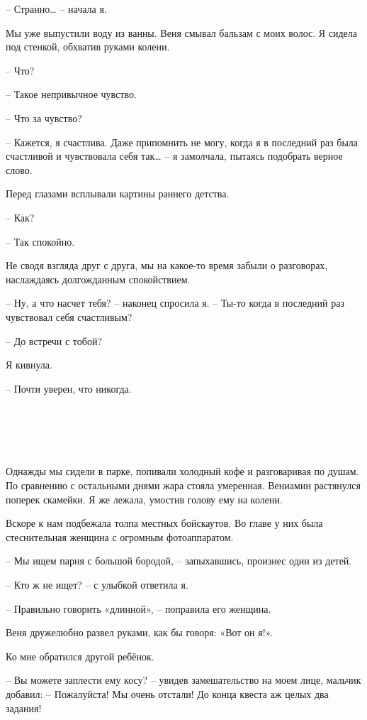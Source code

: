 \documentclass[
]{book}
\begin{document}
-- Странно\ldots{} -- начала я.

Мы уже выпустили воду из ванны. Веня смывал бальзам с моих волос. Я сидела под стенкой, обхватив руками колени.

-- Что?

-- Такое непривычное чувство.

-- Что за чувство?

-- Кажется, я счастлива. Даже припомнить не могу, когда я в последний раз была счастливой и чувствовала себя так\ldots{} -- я замолчала, пытаясь подобрать верное слово.

Перед глазами всплывали картины раннего детства.

-- Как?

-- Так спокойно.

Не сводя взгляда друг с друга, мы на какое-то время забыли о разговорах, наслаждаясь долгожданным спокойствием.

-- Ну, а что насчет тебя? -- наконец спросила я. -- Ты-то когда в последний раз чувствовал себя счастливым?

-- До встречи с тобой?

Я кивнула.

-- Почти уверен, что никогда.

\hypertarget{chapter-19}{%
\chapter{~}\label{chapter-19}}

Однажды мы сидели в парке, попивали холодный кофе и разговаривая по душам. По сравнению с остальными днями жара стояла умеренная. Вениамин растянулся поперек скамейки. Я же лежала, умостив голову ему на колени.

Вскоре к нам подбежала толпа местных бойскаутов. Во главе у них была стеснительная женщина с огромным фотоаппаратом.

-- Мы ищем парня с большой бородой, -- запыхавшись, произнес один из детей.

-- Кто ж не ищет? -- с улыбкой ответила я.

-- Правильно говорить «длинной», -- поправила его женщина.

Веня дружелюбно развел руками, как бы говоря: «Вот он я!».

Ко мне обратился другой ребёнок.

-- Вы можете заплести ему косу? -- увидев замешательство на моем лице, мальчик добавил: -- Пожалуйста! Мы очень отстали! До конца квеста аж целых два задания!
\end{document}
